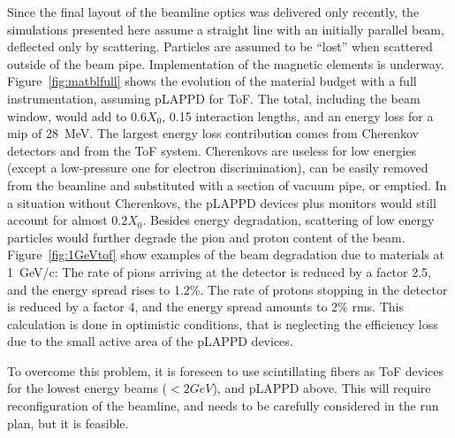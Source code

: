 Since the final layout of the beamline optics was delivered only recently, the simulations presented here assume a straight line with an initially parallel beam, deflected only by scattering. Particles are assumed to be ``lost'' when scattered outside of the beam pipe. Implementation of the magnetic elements is underway.
 Figure~\ref{fig:matblfull} shows the evolution of the material budget with a full instrumentation, assuming pLAPPD for ToF. The total, including the beam window, would add to $0.6X_0$, 0.15 interaction lengths, and an energy loss for a mip of 28~MeV.
The largest energy loss contribution comes from Cherenkov detectors and from the  ToF system. Cherenkovs are useless for low energies (except a low-pressure one for electron discrimination), can be easily removed from the beamline and substituted with a section of vacuum pipe, or emptied.  
In a situation without Cherenkovs, the pLAPPD devices plus monitors would still account for almost  $0.2X_0$. Besides energy degradation, scattering of low energy particles would  further degrade the pion and proton content of the beam.  Figure~\ref{fig:1GeVtof} show examples of the beam degradation due to materials at 1~GeV/c: The rate of pions arriving at the detector is reduced by a factor 2.5, and the energy spread rises to 1.2\%. The rate of protons stopping in the detector is reduced by a factor 4, and the energy spread amounts to 2\% rms. This calculation is done in optimistic conditions, that is neglecting the efficiency loss due to the small active area of the pLAPPD devices.

To overcome this problem, it is foreseen to   use  scintillating fibers as ToF devices for the lowest energy beams ($< 2 GeV$), and pLAPPD above.
   This will require reconfiguration of the beamline, and needs to be carefully considered in the run plan, but it is feasible.  
 


